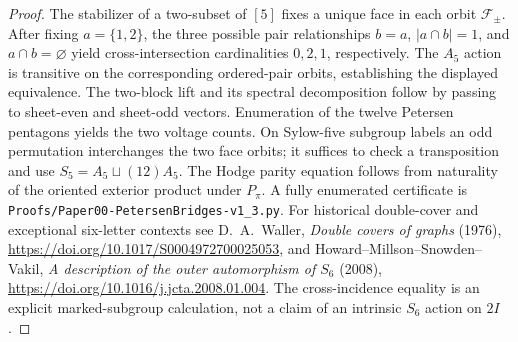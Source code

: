 \documentclass[11pt]{article}
\begin{document}
\begin{proof}
The stabilizer of a two-subset of $[5]$ fixes a unique face in
each orbit $\mathcal F_\pm$.  After fixing $a=\{1,2\}$, the three
possible pair relationships $b=a$, $|a\cap b|=1$, and
$a\cap b=\varnothing$ yield cross-intersection cardinalities
$0,2,1$, respectively.  The $A_5$ action is transitive on the
corresponding ordered-pair orbits, establishing the displayed
equivalence.  The two-block lift and its spectral decomposition
follow by passing to sheet-even and sheet-odd vectors.  Enumeration
of the twelve Petersen pentagons yields the two voltage counts.
On Sylow-five subgroup labels an odd permutation interchanges
the two face orbits; it suffices to check a transposition and use
$S_5=A_5\sqcup(12)A_5$.  The Hodge parity equation follows from
naturality of the oriented exterior product under $P_\pi$.
A fully enumerated certificate is
\texttt{Proofs/Paper00-PetersenBridges-v1\_3.py}.
For historical double-cover and exceptional six-letter contexts see
D.~A.~Waller, \emph{Double covers of graphs} (1976),
\url{https://doi.org/10.1017/S0004972700025053}, and
Howard--Millson--Snowden--Vakil, \emph{A description of the outer
automorphism of $S_6$} (2008),
\url{https://doi.org/10.1016/j.jcta.2008.01.004}.
The cross-incidence equality is an explicit marked-subgroup
calculation, not a claim of an intrinsic $S_6$ action on $2I$.
\end{proof}
\end{document}

